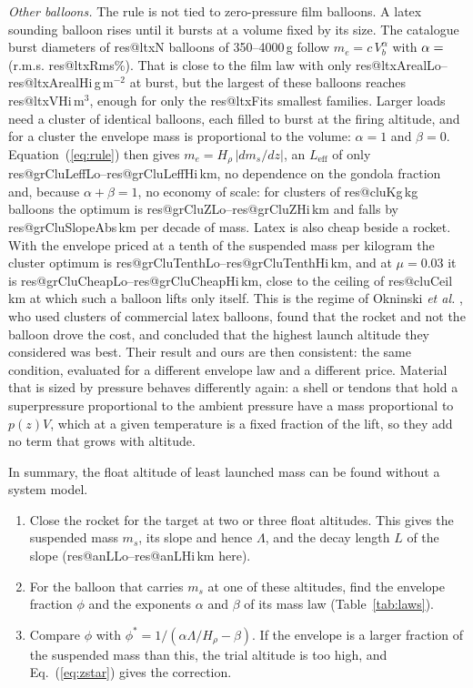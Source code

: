 \documentclass[11pt,a4paper]{article}
\makeatletter
\newcommand{\R}[1]{\csname res@#1\endcsname}
\makeatother
\begin{document}
\emph{Other balloons.} The rule is not tied to zero-pressure film balloons. A latex sounding balloon rises until it bursts at a volume fixed by its size. The catalogue burst diameters of \R{ltxN} balloons of 350--4000\,g \cite{kaymont} follow $m_e=c\,V_b^{\alpha}$ with $\alpha=\R{ltxAlpha}$ (r.m.s. \R{ltxRms}\%). That is close to the film law with only \R{ltxArealLo}--\R{ltxArealHi}\,g\,m$^{-2}$ at burst, but the largest of these balloons reaches \R{ltxVHi}\,m$^3$, enough for only the \R{ltxFits} smallest families. Larger loads need a cluster of identical balloons, each filled to burst at the firing altitude, and for a cluster the envelope mass is proportional to the volume: $\alpha=1$ and $\beta=0$. Equation~(\ref{eq:rule}) then gives $m_e=H_\rho\,|dm_s/dz|$, an $L_{\mathrm{eff}}$ of only \R{grCluLeffLo}--\R{grCluLeffHi}\,km, no dependence on the gondola fraction and, because $\alpha+\beta=1$, no economy of scale: for clusters of \R{cluKg}\,kg balloons the optimum is \R{grCluZLo}--\R{grCluZHi}\,km and falls by \R{grCluSlopeAbs}\,km per decade of mass. Latex is also cheap beside a rocket. With the envelope priced at a tenth of the suspended mass per kilogram the cluster optimum is \R{grCluTenthLo}--\R{grCluTenthHi}\,km, and at $\mu=0.03$ it is \R{grCluCheapLo}--\R{grCluCheapHi}\,km, close to the ceiling of \R{cluCeil}\,km at which such a balloon lifts only itself. This is the regime of Okninski \emph{et al.} \cite{okninski2016}, who used clusters of commercial latex balloons, found that the rocket and not the balloon drove the cost, and concluded that the highest launch altitude they considered was best. Their result and ours are then consistent: the same condition, evaluated for a different envelope law and a different price. Material that is sized by pressure behaves differently again: a shell or tendons that hold a superpressure proportional to the ambient pressure have a mass proportional to $p(z)V$, which at a given temperature is a fixed fraction of the lift, so they add no term that grows with altitude.

In summary, the float altitude of least launched mass can be found without a system model.
\begin{enumerate}
\item Close the rocket for the target at two or three float altitudes. This gives the suspended mass $m_s$, its slope and hence $\Lambda$, and the decay length $L$ of the slope (\R{anLLo}--\R{anLHi}\,km here).
\item For the balloon that carries $m_s$ at one of these altitudes, find the envelope fraction $\phi$ and the exponents $\alpha$ and $\beta$ of its mass law (Table~\ref{tab:laws}).
\item Compare $\phi$ with $\phi^{*}=1/(\alpha\Lambda/H_\rho-\beta)$. If the envelope is a larger fraction of the suspended mass than this, the trial altitude is too high, and Eq.~(\ref{eq:zstar}) gives the correction.
\end{enumerate}
\end{document}
